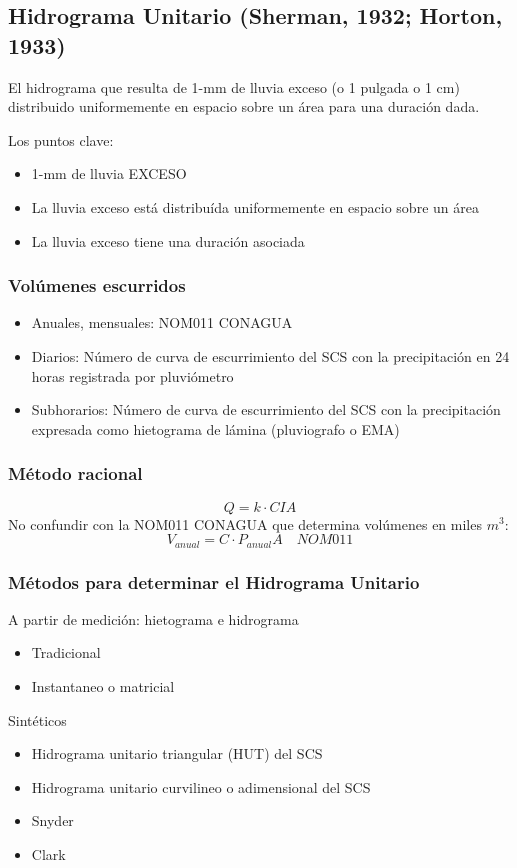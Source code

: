 \subsection{Hidrograma Unitario (Sherman, 1932; Horton, 1933)}
El hidrograma que resulta de 1-mm de lluvia exceso (o 1 pulgada o 1
cm) distribuido uniformemente en espacio sobre un área para una
duración dada.

Los puntos clave:
\begin{itemize}
  \item 1-mm de lluvia EXCESO
  \item La lluvia exceso está distribuída uniformemente en espacio sobre un área
  \item La lluvia exceso tiene una duración asociada
\end{itemize}

\subsubsection{Volúmenes escurridos}
\begin{itemize}
  \item Anuales, mensuales: NOM011 CONAGUA
  \item Diarios: Número de curva de escurrimiento del SCS con la precipitación en 24 horas registrada por pluviómetro
  \item Subhorarios: Número de curva de escurrimiento del SCS con la precipitación expresada como hietograma de lámina (pluviografo o EMA)
\end{itemize}
\subsubsection{Método racional}
\begin{equation}
  Q =k \cdot CIA
\end{equation}
No confundir con la NOM011 CONAGUA que determina volúmenes en miles $m^3$:
\begin{equation}
  V_{anual}= C \cdot P_{anual}A\quad NOM011
\end{equation}
\subsubsection{Métodos para determinar el Hidrograma Unitario}
A partir de medición: hietograma e hidrograma
\begin{itemize}
    \item Tradicional
    \item Instantaneo o matricial
\end{itemize}
Sintéticos
\begin{itemize}
    \item Hidrograma unitario triangular (HUT) del SCS
    \item Hidrograma unitario curvilineo o adimensional del SCS
    \item Snyder
    \item Clark    
\end{itemize}

